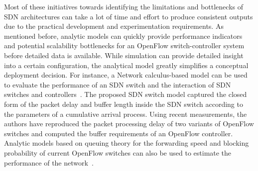 Most of these initiatives towards identifying the limitations and bottlenecks of SDN architectures can take a lot of time and effort to produce consistent outputs due to the practical development and experimentation requirements.
As mentioned before, analytic models can quickly provide performance indicators and potential scalability bottlenecks for an OpenFlow switch-controller system before detailed data is available. 
While simulation can provide detailed insight into a certain configuration, the analytical model greatly simplifies a conceptual deployment decision. 
For instance, a Network calculus-based model can be used to evaluate the performance of an SDN switch and the interaction of SDN switches and controllers~\cite{azodolmolky2013-3}.  
The proposed SDN switch model captured the closed form of the packet delay and buffer length inside the SDN switch according to the parameters of a cumulative arrival process. 
Using recent measurements, the authors have reproduced the packet processing delay of two variants of OpenFlow switches and computed the buffer requirements of an OpenFlow controller.
Analytic models based on queuing theory for the forwarding speed and blocking probability of current OpenFlow 
switches can also be used to estimate the performance of the network~\cite{jarschel2011}.


